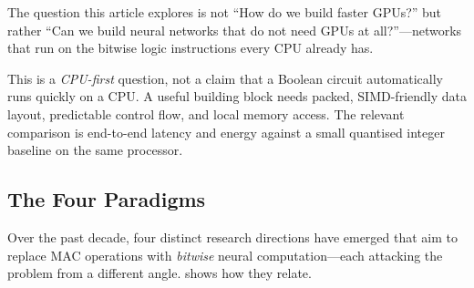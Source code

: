 \begin{keyinsight}
The question this article explores is not ``How do we build faster
GPUs?'' but rather ``Can we build neural networks that do not need
GPUs at all?''---networks that run on the bitwise logic instructions
every CPU already has.
\end{keyinsight}

\begin{engineernote}
This is a \emph{CPU-first} question, not a claim that a Boolean circuit
automatically runs quickly on a CPU. A useful building block needs packed,
SIMD-friendly data layout, predictable control flow, and local memory
access. The relevant comparison is end-to-end latency and energy against a
small quantised integer baseline on the same processor.
\end{engineernote}

\subsection{The Four Paradigms}

Over the past decade, four distinct research directions have emerged
that aim to replace MAC operations with \emph{bitwise} neural
computation---each attacking the problem from a different angle.
 shows how they relate.

